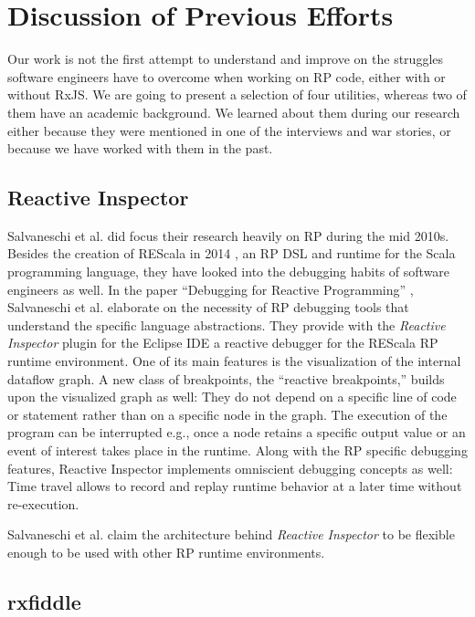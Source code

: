 \documentclass[12pt,a4paper]{article}
\begin{document}
\section{Discussion of Previous Efforts}
\label{sec:discussion}

Our work is not the first attempt to understand and improve on the struggles software engineers have to overcome when working on RP code, either with or without RxJS. We are going to present a selection of four utilities, whereas two of them have an academic background. We learned about them during our research either because they were mentioned in one of the interviews and war stories, or because we have worked with them in the past.

\subsection{Reactive Inspector}

Salvaneschi et al. did focus their research heavily on RP during the mid 2010s. Besides the creation of REScala in 2014 \cite{10.1145/2577080.2577083}, an RP DSL and runtime for the Scala programming language, they have looked into the debugging habits of software engineers as well. In the paper ``Debugging for Reactive Programming'' \cite{10.1145/2884781.2884815}, Salvaneschi et al. elaborate on the necessity of RP debugging tools that understand the specific language abstractions. They provide with the \emph{Reactive Inspector} plugin for the Eclipse IDE a reactive debugger for the REScala RP runtime environment. One of its main features is the visualization of the internal dataflow graph. A new class of  breakpoints, the ``reactive breakpoints,'' builds upon the visualized graph as well: They do not depend on a specific line of code or statement rather than on a specific node in the graph. The execution of the program can be interrupted e.g., once a node retains a specific output value or an event of interest takes place in the runtime. Along with the RP specific debugging features, Reactive Inspector implements omniscient debugging concepts as well: Time travel allows to record and replay runtime behavior at a later time without re-execution.

Salvaneschi et al. claim\cite{10.1145/2577080.2577083} the architecture behind \emph{Reactive Inspector} to be flexible enough to be used with other RP runtime environments.

\subsection{rxfiddle}
\end{document}
